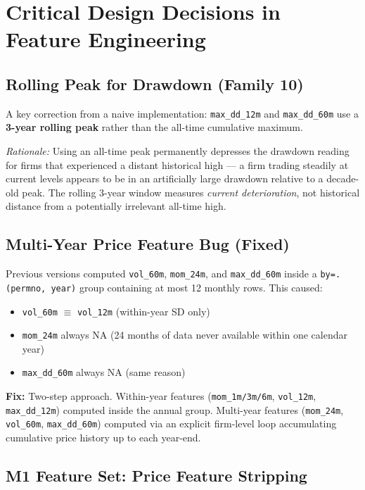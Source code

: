 \documentclass{report}\usepackage[]{graphicx}\usepackage[table]{xcolor}
\begin{document}
\section{Critical Design Decisions in Feature Engineering}

\subsection{Rolling Peak for Drawdown (Family 10)}

A key correction from a naive implementation: \texttt{max\_dd\_12m} and \texttt{max\_dd\_60m} 
use a \textbf{3-year rolling peak} rather than the all-time cumulative maximum. 

\noindent \textit{Rationale:} Using an all-time peak permanently depresses the drawdown 
reading for firms that experienced a distant historical high — a firm trading 
steadily at current levels appears to be in an artificially large drawdown relative 
to a decade-old peak. The rolling 3-year window measures \textit{current deterioration}, 
not historical distance from a potentially irrelevant all-time high.

\subsection{Multi-Year Price Feature Bug (Fixed)}

Previous versions computed \texttt{vol\_60m}, \texttt{mom\_24m}, and \texttt{max\_dd\_60m} 
inside a \texttt{by=.(permno, year)} group containing at most 12 monthly rows. This caused:
\begin{itemize}
    \item \texttt{vol\_60m} $\equiv$ \texttt{vol\_12m} (within-year SD only)
    \item \texttt{mom\_24m} always NA (24 months of data never available within one calendar year)
    \item \texttt{max\_dd\_60m} always NA (same reason)
\end{itemize}

\noindent \textbf{Fix:} Two-step approach. Within-year features (\texttt{mom\_1m/3m/6m}, 
\texttt{vol\_12m}, \texttt{max\_dd\_12m}) computed inside the annual group. 
Multi-year features (\texttt{mom\_24m}, \texttt{vol\_60m}, \texttt{max\_dd\_60m}) 
computed via an explicit firm-level loop accumulating cumulative price history up to each year-end.

\subsection{M1 Feature Set: Price Feature Stripping}
\end{document}
